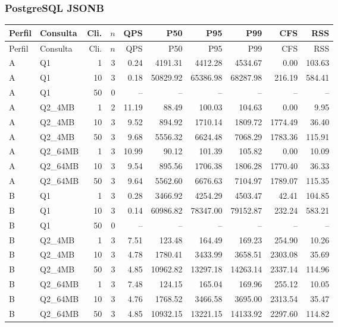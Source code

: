 \documentclass[11pt,letterpaper]{article}
\begin{document}
\subsubsection{PostgreSQL JSONB}
{\fontsize{7.5}{9}\selectfont\setlength{\tabcolsep}{3pt}
\begin{longtable}{llrrrrrrrr}
\toprule Perfil & Consulta & Cli. & $n$ & QPS & P50 & P95 & P99 & CFS & RSS\\\midrule\endfirsthead
\toprule Perfil & Consulta & Cli. & $n$ & QPS & P50 & P95 & P99 & CFS & RSS\\\midrule\endhead
\bottomrule\endfoot
A & Q1 & 1 & 3 & 0.24 & 4191.31 & 4412.28 & 4534.67 & 0.00 & 103.63\\
A & Q1 & 10 & 3 & 0.18 & 50829.92 & 65386.98 & 68287.98 & 216.19 & 584.41\\
A & Q1 & 50 & 0 & -- & -- & -- & -- & -- & --\\
A & Q2\_4MB & 1 & 2 & 11.19 & 88.49 & 100.03 & 104.63 & 0.00 & 9.95\\
A & Q2\_4MB & 10 & 3 & 9.52 & 894.92 & 1710.14 & 1809.72 & 1774.49 & 36.40\\
A & Q2\_4MB & 50 & 3 & 9.68 & 5556.32 & 6624.48 & 7068.29 & 1783.36 & 115.91\\
A & Q2\_64MB & 1 & 3 & 10.99 & 90.12 & 101.39 & 105.82 & 0.00 & 10.09\\
A & Q2\_64MB & 10 & 3 & 9.54 & 895.56 & 1706.38 & 1806.28 & 1770.40 & 36.33\\
A & Q2\_64MB & 50 & 3 & 9.64 & 5562.60 & 6676.63 & 7104.97 & 1789.07 & 115.35\\
B & Q1 & 1 & 3 & 0.28 & 3466.92 & 4254.29 & 4503.47 & 42.41 & 104.85\\
B & Q1 & 10 & 3 & 0.14 & 60986.82 & 78347.00 & 79152.87 & 232.24 & 583.21\\
B & Q1 & 50 & 0 & -- & -- & -- & -- & -- & --\\
B & Q2\_4MB & 1 & 3 & 7.51 & 123.48 & 164.49 & 169.23 & 254.90 & 10.26\\
B & Q2\_4MB & 10 & 3 & 4.78 & 1780.41 & 3433.99 & 3658.51 & 2303.08 & 35.69\\
B & Q2\_4MB & 50 & 3 & 4.85 & 10962.82 & 13297.18 & 14263.14 & 2337.14 & 114.96\\
B & Q2\_64MB & 1 & 3 & 7.48 & 124.15 & 165.04 & 169.96 & 255.12 & 10.05\\
B & Q2\_64MB & 10 & 3 & 4.76 & 1768.52 & 3466.58 & 3695.00 & 2313.54 & 35.47\\
B & Q2\_64MB & 50 & 3 & 4.85 & 10932.15 & 13221.15 & 14133.92 & 2297.60 & 114.82\\

\end{longtable}}
\end{document}
